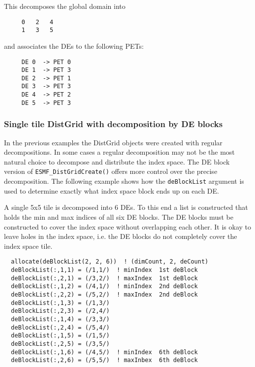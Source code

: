 
   This decomposes the global domain into
   \begin{verbatim}
     0   2   4
     1   3   5
   \end{verbatim}
   and associates the DEs to the following PETs:
   \begin{verbatim}
     DE 0  -> PET 0
     DE 1  -> PET 3
     DE 2  -> PET 1
     DE 3  -> PET 3
     DE 4  -> PET 2
     DE 5  -> PET 3
   \end{verbatim} 

   \subsubsection{Single tile DistGrid with decomposition by DE blocks}
   
   In the previous examples the DistGrid objects were created with regular
   decompositions. In some cases a regular decomposition may not be the most
   natural choice to decompose and distribute the index space. The 
   DE block version of {\tt ESMF\_DistGridCreate()} offers more control
   over the precise decomposition. The following example shows how the 
   {\tt deBlockList} argument is used to determine exactly what index space
   block ends up on each DE.
  
   A single 5x5 tile is decomposed into 6 DEs. To this end a list is
   constructed that holds the min and max indices of all six DE
   blocks. The DE blocks must be constructed to cover the index space without
   overlapping each other. It is okay to leave holes in the index space, i.e.
   the DE blocks do not completely cover the index space tile. 

 \begin{verbatim}
  allocate(deBlockList(2, 2, 6))  ! (dimCount, 2, deCount)
  deBlockList(:,1,1) = (/1,1/)  ! minIndex  1st deBlock
  deBlockList(:,2,1) = (/3,2/)  ! maxIndex  1st deBlock
  deBlockList(:,1,2) = (/4,1/)  ! minIndex  2nd deBlock
  deBlockList(:,2,2) = (/5,2/)  ! maxIndex  2nd deBlock
  deBlockList(:,1,3) = (/1,3/)
  deBlockList(:,2,3) = (/2,4/)
  deBlockList(:,1,4) = (/3,3/)
  deBlockList(:,2,4) = (/5,4/)
  deBlockList(:,1,5) = (/1,5/)
  deBlockList(:,2,5) = (/3,5/)
  deBlockList(:,1,6) = (/4,5/)  ! minIndex  6th deBlock
  deBlockList(:,2,6) = (/5,5/)  ! maxInbex  6th deBlock
 
\end{verbatim}
 
